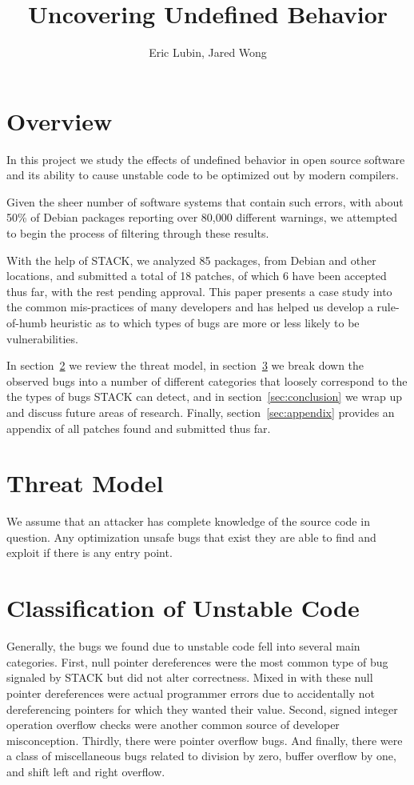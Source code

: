 \documentclass[11pt,twocolumn]{article}
\title{Uncovering Undefined Behavior}
\author{Eric Lubin, Jared Wong}
\newcommand{\NumPackages}{85 }
\newcommand{\NumPatches}{18 }
\newcommand{\NumPatchesAccepted}{6 }
\begin{document}
\maketitle

\section{Overview}
In this project we study the effects of undefined behavior in open source software
and its ability to cause unstable code to be optimized out by modern compilers.

Given the sheer number of software systems that contain such errors, 
with about 50\% of Debian packages reporting over 80,000 different warnings,
we attempted to begin the process of filtering through these results. 

With the help of STACK\cite{stack}, we analyzed \NumPackages packages, 
from Debian and other locations, and submitted a total of \NumPatches patches, 
of which \NumPatchesAccepted have been accepted thus far, with the rest pending approval.
This paper presents a case study into the common mis-practices of many developers and
has helped us develop a rule-of-humb heuristic as to which types of bugs are more
or less likely to be vulnerabilities.

In section~\ref{sec:threat} we review the threat model, in section~\ref{sec:classification}
we break down the observed bugs into a number of different categories that loosely 
correspond to the the types of bugs STACK can detect, and in section~\ref{sec:conclusion}
we wrap up and discuss future areas of research. Finally, section~\ref{sec:appendix} provides an 
appendix of all patches found and submitted thus far.

\section{Threat Model}
\label{sec:threat}
We assume that an attacker has complete knowledge of the source code in question. Any 
optimization unsafe bugs that exist they are able to find and exploit if there is any entry point.

\section{Classification of Unstable Code}
\label{sec:classification}
Generally, the bugs we found due to unstable code fell into several
main categories. First, null pointer dereferences were the  most common type of 
bug signaled by STACK but did not alter correctness. Mixed in with these null pointer dereferences
were actual programmer errors due to accidentally not dereferencing pointers for which
they wanted their value. Second, signed integer operation overflow checks were another common source
of developer misconception. Thirdly, there were pointer overflow bugs. And finally, there were a class
of miscellaneous bugs related to division by zero, buffer overflow by one, and shift left and right overflow.
\end{document}

